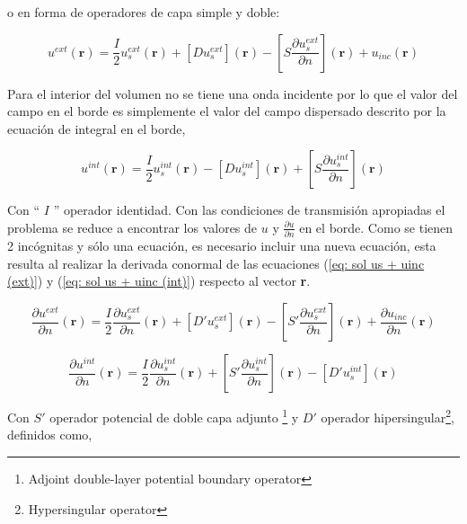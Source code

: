 \documentclass[12pt,letterpaper]{article}
\numberwithin{equation}{section}
\begin{document}
o en forma de operadores de capa simple y doble:

\begin{equation}
\boxed{
u^{ext}(\textbf{r})=\frac{I}{2}u_s^{ext}(\textbf{r}) + \left[D u_s^{ext}\right](\textbf{r}) - \left[S \frac{\partial u_s^{ext}}{\partial n}\right](\textbf{r}) + u_{inc}(\textbf{r})
}
\label{eq: sol us + uinc (ext)}
\end{equation}

Para el interior del volumen no se tiene una onda incidente por lo que el valor del campo en el borde es simplemente el valor del campo dispersado descrito por la ecuación de integral en el borde,

\begin{equation}
\boxed{
u^{int}(\textbf{r})= \frac{I}{2}u_s^{int}(\textbf{r}) - \left[D u_s^{int}\right](\textbf{r}) + \left[S \frac{\partial u_s^{int}}{\partial n}\right](\textbf{r})
}
\label{eq: sol us + uinc (int)}
\end{equation}

Con `` $I$ '' operador identidad. Con las condiciones de transmisión apropiadas el problema se reduce a encontrar los valores de $u$ y $\frac{\partial u}{\partial n}$ en el borde. Como se tienen 2 incógnitas y sólo una ecuación, es necesario incluir una nueva ecuación, esta resulta al realizar la derivada conormal de las ecuaciones (\ref{eq: sol us + uinc (ext)}) y (\ref{eq: sol us + uinc (int)}) respecto al vector \textbf{r}. 

\begin{equation}
\frac{\partial u^{ext}}{\partial n}(\textbf{r})=\frac{I}{2}\frac{\partial u_s^{ext}}{\partial n}(\textbf{r}) + \left[D' u_s^{ext}\right](\textbf{r}) - \left[S' \frac{\partial u_s^{ext}}{\partial n}\right](\textbf{r}) + \frac{\partial u_{inc}}{\partial n}(\textbf{r})
\label{eq: sol deriv us + uinc (ext)}
\end{equation}

\begin{equation}
\frac{\partial u^{int}}{\partial n}(\textbf{r})=\frac{I}{2}\frac{\partial u_s^{int}}{\partial n}(\textbf{r}) + \left[S' \frac{\partial u_s^{int}}{\partial n}\right](\textbf{r}) - \left[D' u_s^{int}\right](\textbf{r})
\label{eq: sol deriv us + uinc (int)}
\end{equation}


Con $S'$ operador potencial de doble capa adjunto \footnote{Adjoint double-layer potential boundary operator} y $D'$ operador hipersingular\footnote{Hypersingular operator}, definidos como,
\end{document}
